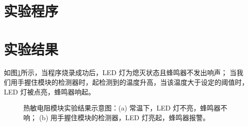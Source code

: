 \documentclass[UTF8, oneside]{ctexbook}
\begin{document}
\section{实验程序}


\section{实验结果}
\paragraph{}
如图\ref{s14_1}所示，当程序烧录成功后，LED 灯为熄灭状态且蜂鸣器不发出响声；
当我们用手握住模块的检测器时，起检测到的温度升高，当该温度大于设定的阈值时，
LED 灯被点亮，蜂鸣器响起。

\newpage

\begin{figure}[h]
    \centering


    \centering
    \caption{热敏电阻模块实验结果示意图：(a) 常温下，LED 灯不亮，蜂鸣器不响；
    (b) 用手握住模块的检测器，LED 灯亮起，蜂鸣器报警。}
    \label{s14_1}
    
\end{figure}
\end{document}
